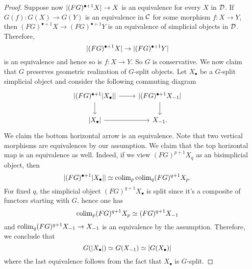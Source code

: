 \begin{proof}
	Suppose now $\lvert(FG)^{\bullet+1}X\rvert \to X$ is an equivalence for every $X$ in ${\mathcal{D}}$. If $G(f): G(X) \to G(Y)$ is an equivalence in ${\mathcal{C}}$ for some morphism $f:X \to Y$, then $(FG)^{\bullet+1} X \to (FG)^{\bullet+1}Y$ is an equivalence of simplicial objects in ${\mathcal{D}}$. Therefore, 
	$$
	\lvert(FG)^{\bullet+1} X\rvert \to \lvert(FG)^{\bullet+1} Y\rvert
	$$
	is an equivalence and hence so is $f: X\to Y$. So $G$ is conservative.
	We now claim that $G$ preserves geometric realization of $G$-split objects.
	Let $X_{\bullet}$ be a $G$-split simplicial object and consider the following commuting diagram
	\[
	\begin{tikzcd}
		\abs{(FG)^{\bullet+1} \abs{X_{\bullet}}} \ar[r] \ar[d]& \abs{(FG)^{\bullet+1} X_{-1} \ar[d]}     \\
		\abs{X_{\bullet}} \ar[r] & X_{-1}  .
	\end{tikzcd}
	\]
	We claim the bottom horizontal arrow is an equivalence.
	Note that two vertical morphisms are equivalences by our assumption. We claim that the top horizontal map is an equivalence as well. Indeed, if we view $(FG)^{p+1} X_{q}$ as an bisimplicial object, then 
	$$
	\lvert(FG)^{\bullet+1} \lvert X_{\bullet}\rvert\rvert 
	\simeq 
	\operatorname{colim}_{p} \operatorname{colim}_q (FG)^{q+1}X_{p} .
	$$
	For fixed $q$, the simplicial object $(FG)^{q+1}X_{\bullet}$ is split since it's a composite of functors starting with $G$, hence one has 
	$$
	\operatorname{colim}_{p}(FG)^{q+1}X_{p}\simeq (FG)^{q+1}X_{-1}
	$$
	and $\operatorname{colim}_{q} (FG)^{q+1} X_{-1} \to X_{-1}$  is an equivalence by the assumption.
	Therefore, we conclude that 
	$$
	G(\lvert X_{\bullet}\rvert) \simeq G(X_{-1}) \simeq \lvert G(X_{\bullet})\rvert
	$$
	where the last equivalence follows from the fact that $X_{\bullet}$ is $G$-split.
\end{proof}

